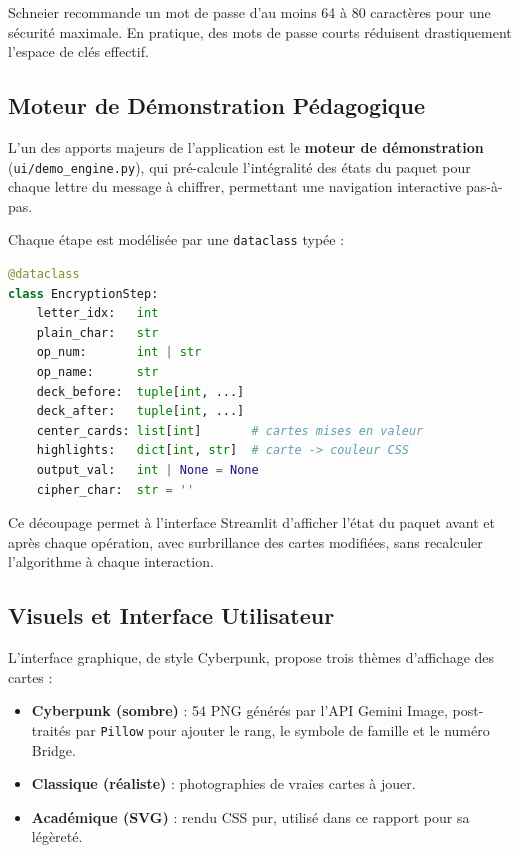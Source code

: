 \documentclass[12pt,a4paper]{article}
\begin{document}
Schneier recommande un mot de passe d'au moins 64 à 80 caractères pour une sécurité maximale. En pratique, des mots de passe courts réduisent drastiquement l'espace de clés effectif.

\subsection{Moteur de Démonstration Pédagogique}
L'un des apports majeurs de l'application est le \textbf{moteur de démonstration} (\texttt{ui/demo\_engine.py}), qui pré-calcule l'intégralité des états du paquet pour chaque lettre du message à chiffrer, permettant une navigation interactive pas-à-pas.

Chaque étape est modélisée par une \texttt{dataclass} typée :
\begin{lstlisting}[language=Python, caption={Structure d'une étape de démonstration (ui/demo\_engine.py)}]
@dataclass
class EncryptionStep:
    letter_idx:   int
    plain_char:   str
    op_num:       int | str
    op_name:      str
    deck_before:  tuple[int, ...]
    deck_after:   tuple[int, ...]
    center_cards: list[int]       # cartes mises en valeur
    highlights:   dict[int, str]  # carte -> couleur CSS
    output_val:   int | None = None
    cipher_char:  str = ''
\end{lstlisting}

Ce découpage permet à l'interface Streamlit d'afficher l'état du paquet avant et après chaque opération, avec surbrillance des cartes modifiées, sans recalculer l'algorithme à chaque interaction.

\subsection{Visuels et Interface Utilisateur}
L'interface graphique, de style Cyberpunk, propose trois thèmes d'affichage des cartes :

\begin{itemize}
    \item \textbf{Cyberpunk (sombre)} : 54 PNG générés par l'API Gemini Image, post-traités par \texttt{Pillow} pour ajouter le rang, le symbole de famille et le numéro Bridge.
    \item \textbf{Classique (réaliste)} : photographies de vraies cartes à jouer.
    \item \textbf{Académique (SVG)} : rendu CSS pur, utilisé dans ce rapport pour sa légèreté.
\end{itemize}
\end{document}
